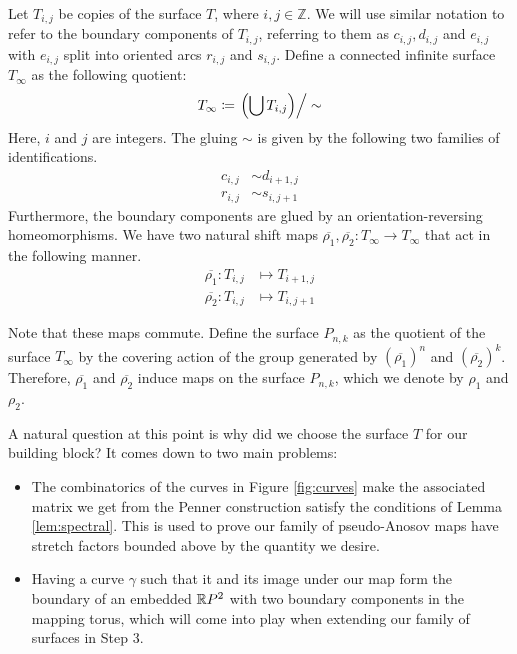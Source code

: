 Let $T_{i,j}$ be copies of the surface $T$, where $i,j \in \mathbb{Z}$. We will use similar notation to refer
to the boundary components of $T_{i,j}$, referring to them as $c_{i,j}, d_{i,j}$ and $e_{i,j}$ with $e_{i,j}$ split into oriented arcs $r_{i,j}$ and $s_{i,j}$. Define a connected infinite surface $T_\infty$ as the following quotient:
\begin{align*}
  T_\infty \coloneqq \left. \left( \bigcup T_{i,j} \right)\right/\sim
\end{align*}
Here, $i$ and $j$ are integers. The gluing $\sim$ is given by the following two families of
identifications.
\begin{align*}
  c_{i,j} &\sim d_{i+1,j} \\
  r_{i,j} &\sim s_{i,j+1}
\end{align*}
Furthermore, the boundary components are glued by an orientation-reversing homeomorphisms.  We have two
natural shift maps $\overline{\rho_1},\overline{\rho_2}: T_\infty \to T_\infty$ that act in the
following manner.
\begin{align*}
  \overline{\rho_1}: T_{i,j} &\mapsto T_{i+1, j} \\
  \overline{\rho_2}: T_{i,j} &\mapsto T_{i, j+1}
\end{align*}

Note that these maps commute. Define the surface $P_{n,k}$ as the quotient of the surface $T_\infty$ by the
covering action of the group generated by $(\overline{\rho_1})^n$ and $(\overline{\rho_2})^k$. Therefore,
$\overline{\rho_1}$ and $\overline{\rho_2}$ induce maps on the surface $P_{n,k}$, which we denote by $\rho_1$
and $\rho_2$.

A natural question at this point is why did we choose the surface $T$ for our building block? It comes down to
two main problems:
\begin{itemize}
\item The combinatorics of the curves in Figure \ref{fig:curves} make the associated matrix we get from the Penner construction satisfy
  the conditions of Lemma \ref{lem:spectral}. This is used to prove our family of pseudo-Anosov maps have
  stretch factors bounded above by the quantity we desire.
\item Having a curve $\gamma$ such that it and its image under our map form the boundary of an embedded
  $\mathbb{R} P^2$ with two boundary components in the mapping torus, which will come into play when extending our family of surfaces in Step 3.
\end{itemize}

